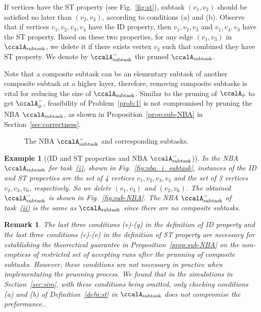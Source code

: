 \documentclass[Afour,sageh,times]{sagej}
\newtheorem{exmp}{Example}
\newtheorem{rem}[thm]{Remark}
\newcommand{\auto}[1]{\ccalA_{\textup{#1}}}
\newcommand{\autop}{\ccalA_{\phi}}
\newenvironment{cexmp}
{\addtocounter{exmp}{-1}\begin{exmp}}
  {\end{exmp}}
\begin{document}
If vertices have the ST  property (see Fig.~\ref{fig:st}), subtask $(v_1, v_2)$ should be satisfied no later than $(v_2, v_3)$, according to conditions (a) and (b). Observe that if vertices $v_1, v_2, v_3, v_4$ have the ID property, then $v_1, v_2, v_3$ and $v_1, v_4, v_3$ have the ST property. Based on these two properties, for any edge $(v_1, v_3)$ in $\auto{subtask}$, we delete it if there exists  vertex $v_2$ such that combined they have  ST property. We denote by $\auto{subtask}^-$ the pruned $\auto{subtask}$.

Note that a composite subtask can be an elementary subtask of another composite subtask at a higher layer, therefore, removing composite subtasks  is vital for reducing the size of $\auto{subtask}$. Similar to the pruning of $\autop$ to get $\autop^-$, feasibility of Problem~\ref{prob:1} is not compromised by pruning the NBA $\auto{subtask}$, as shown in Proposition~\ref{prop:sub-NBA} in Section~\ref{sec:correctness}. %
\begin{figure}[t]
    \centering
    \subfigure[$\auto{subtask}^-$]{
      \label{fig:sub-NBA}
      \texttt{[image: nba\_i\_subtask\_prune.pdf]}}
    \hspace{2em}
        \caption{The NBA $\auto{subtask}^-$ and corresponding subtasks.} \label{fig:subtask_prune}
\end{figure}
\begin{cexmp} [(ID and ST properties and NBA $\auto{subtask}^-$)]
  In the NBA $\auto{subtask}$ for task~\hyperref[task:i]{\it (i)}, shown in Fig.~\ref{fig:nba_i_subtask}, instances of the ID and ST properties are the set of 4 vertices $v_1, v_2, v_3, v_4$ and the set of 3 vertices $v_2, v_3, v_6$, respectively. So we delete $(v_1, v_3)$ and $(v_2, v_6)$. The obtained $\auto{subtask}^-$ is shown in Fig.~\ref{fig:sub-NBA}. The NBA $\auto{subtask}^-$ of task~\hyperref[task:ii]{\it (ii)} is the same as $\auto{subtask}$ since there are no composite subtasks.
\end{cexmp}

\begin{rem}
  The last three conditions (e)-(g) in the definition of ID property and the last three conditions (c)-(e) in the definition of ST property are necessary for establishing the theorectical guarantee in Proposition~\ref{prop:sub-NBA}  on the non-emptiess of restricted set of accepting runs after the prunning of composite subtasks. However, these conditions are not necessary in practice when implementating the prunning process. We found that in the simulations in Section~\ref{sec:sim}, with these conditions being omitted, only checking conditions (a) and (b) of Definition~\ref{defn:st} in $\auto{subtask}$  does not compromise  the preformance..
\end{rem}
\end{document}

